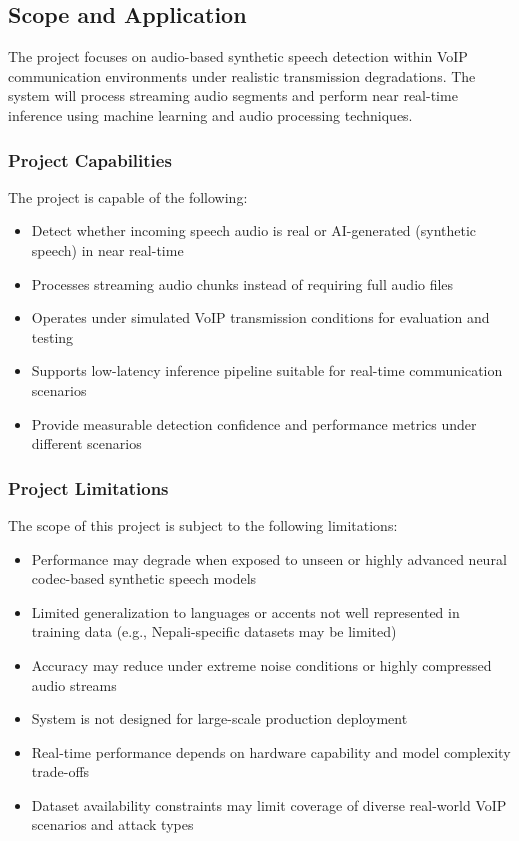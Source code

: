 \subsection{Scope and Application}

The project focuses on audio-based synthetic speech detection within VoIP communication environments under realistic transmission degradations. The system will process streaming audio segments and perform near real-time inference using machine learning and audio processing techniques. 

\subsubsection{Project Capabilities}

The project is capable of the following:
\begin{itemize}
    \item Detect whether incoming speech audio is real or AI-generated (synthetic speech) in near real-time
    \item Processes streaming audio chunks instead of requiring full audio files
    \item Operates under simulated VoIP transmission conditions for evaluation and testing
    \item Supports low-latency inference pipeline suitable for real-time communication scenarios
    \item Provide measurable detection confidence and performance metrics under different scenarios
\end{itemize}


\subsubsection{Project Limitations}

The scope of this project is subject to the following limitations:
\begin{itemize}
    \item Performance may degrade when exposed to unseen or highly advanced neural codec-based synthetic speech models
    \item Limited generalization to languages or accents not well represented in training data (e.g., Nepali-specific datasets may be limited)
    \item Accuracy may reduce under extreme noise conditions or highly compressed audio streams
    \item System is not designed for large-scale production deployment
    \item Real-time performance depends on hardware capability and model complexity trade-offs
    \item Dataset availability constraints may limit coverage of diverse real-world VoIP scenarios and attack types
\end{itemize}


